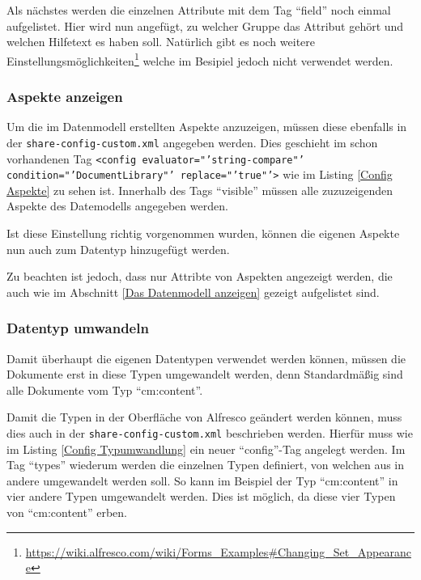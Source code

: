 Als n\"achstes werden die einzelnen Attribute mit dem Tag "`field"' noch einmal aufgelistet. Hier wird nun angef\"ugt, zu welcher Gruppe das Attribut geh\"ort und welchen Hilfetext es haben soll. Nat\"urlich gibt es noch weitere Einstellungsm\"oglichkeiten\footnote{\url{https://wiki.alfresco.com/wiki/Forms\_Examples\#Changing\_Set\_Appearance}} welche im Besipiel jedoch nicht verwendet werden.



\subsubsection{Aspekte anzeigen}
Um die im Datenmodell erstellten Aspekte anzuzeigen, m\"ussen diese ebenfalls in der \texttt{share-config-custom.xml} angegeben werden.
Dies geschieht im schon vorhandenen Tag \texttt{<config evaluator="'string-compare"' condition="'DocumentLibrary"' replace="'true"'>} wie im Listing \ref{Config Aspekte} zu sehen ist. Innerhalb des Tags "`visible"' m\"ussen alle zuzuzeigenden Aspekte des Datemodells angegeben werden.

Ist diese Einstellung richtig vorgenommen wurden, k\"onnen die eigenen Aspekte nun auch zum Datentyp hinzugef\"ugt werden.

Zu beachten ist jedoch, dass nur Attribte von Aspekten angezeigt werden, die auch wie im Abschnitt \ref{Das Datenmodell anzeigen} gezeigt aufgelistet sind.



\subsubsection{Datentyp umwandeln}
Damit \"uberhaupt die eigenen Datentypen verwendet werden k\"onnen, m\"ussen die Dokumente erst in diese Typen umgewandelt werden, denn Standardm\"a\ss{}ig sind alle Dokumente vom Typ "`cm:content"'.

Damit die Typen in der Oberfl\"ache von Alfresco ge\"andert werden k\"onnen, muss dies auch in der \texttt{share-config-custom.xml} beschrieben werden. Hierf\"ur muss wie im Listing \ref{Config Typumwandlung} ein neuer "`config"'-Tag angelegt werden. Im Tag "`types"' wiederum werden die einzelnen Typen definiert, von welchen aus in andere umgewandelt werden soll. So kann im Beispiel der Typ "`cm:content"' in vier andere Typen umgewandelt werden. Dies ist m\"oglich, da diese vier Typen von "`cm:content"' erben.

